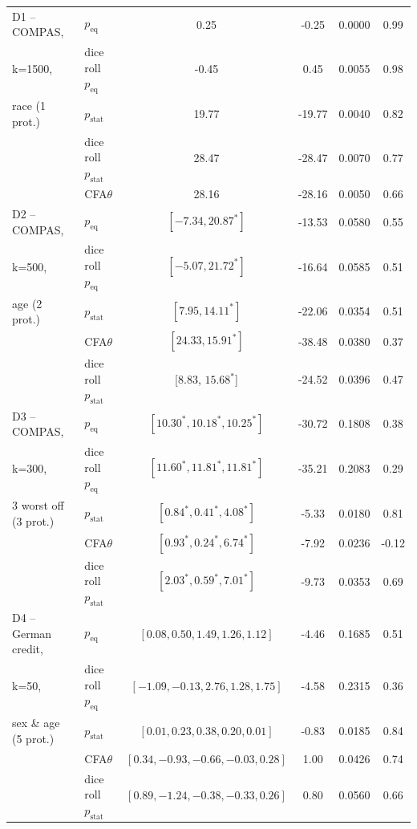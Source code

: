\begin{table}[t!]
{\begin{tabular}{llcccc}
		\midrule
		\midrule
		D1 -- COMPAS,	& \algoFAIR $p_{\text{eq}}$ 	& 0.25 	& -0.25 	& 0.0000	& 0.99\\
		k=1500,			& dice roll $p_{\text{eq}}$		& -0.45 & 0.45		& 0.0055 	& 0.98\\
						\cline{2-6}
		race (1 prot.)	& \algoFAIR $p_{\text{stat}}$	& 19.77 & -19.77 	& 0.0040 	& 0.82\\
						& dice roll $p_{\text{stat}}$	& 28.47 & -28.47	& 0.0070	& 0.77 \\
						& CFA$\theta$ 					& 28.16 & -28.16	& 0.0050	& 0.66\\
		\midrule
		\midrule
		D2 -- COMPAS, 	& \algoFAIR $p_{\text{eq}}$ 	& $[-7.34, 20.87^*]$ 	& -13.53 	& 0.0580 & 0.55 \\
		k=500,			& dice roll $p_{\text{eq}}$		& $[-5.07, 21.72^*]$ 	& -16.64	& 0.0585 & 0.51\\
						\cline{2-6}
		age (2 prot.)	& \algoFAIR $p_{\text{stat}}$ 	& $[7.95, 14.11^*]$ 	& -22.06 	& 0.0354 & 0.51 \\
						& CFA$\theta$ 					& $[24.33, 15.91^*]$ 	& -38.48	& 0.0380 & 0.37 \\ %
						& dice roll $p_{\text{stat}}$	& [8.83, $15.68^*$] 	& -24.52	& 0.0396 & 0.47 \\
		\midrule
		\midrule
		D3 -- COMPAS, 			& \algoFAIR  $p_{\text{eq}}$ 	& $[10.30^*, 10.18^*, 10.25^*]$ & -30.72	& 0.1808 & 0.38 \\
		k=300, 					& dice roll $p_{\text{eq}}$		& $[11.60^*, 11.81^*, 11.81^*]$	& -35.21	& 0.2083 & 0.29\\
								\cline{2-6}
		3 worst off (3 prot.)	& \algoFAIR  $p_{\text{stat}}$ 	& $[0.84^*, 0.41^*, 4.08^*]$ 	& -5.33		& 0.0180 & 0.81\\
							 	& CFA$\theta$ 					& $[0.93^*, 0.24^*, 6.74^*]$ 	& -7.92		& 0.0236 & -0.12 \\
								& dice roll $p_{\text{stat}}$	& $[2.03^*, 0.59^*, 7.01^*]$	& -9.73		& 0.0353 & 0.69 \\

		\midrule
		\midrule
		D4 -- German credit, 	& \algoFAIR $p_{\text{eq}}$ 	&  $[0.08, 0.50, 1.49, 1.26, 1.12]$ 	& -4.46 &	0.1685	& 0.51 \\
		k=50,					& dice roll $p_{\text{eq}}$		& $[-1.09, -0.13, 2.76, 1.28, 1.75]$	& -4.58	& 0.2315 & 0.36\\
								\cline{2-6}
		sex \& age (5 prot.)	& \algoFAIR $p_{\text{stat}}$ 	&  $[0.01, 0.23, 0.38, 0.20, 0.01]$		& -0.83 &	0.0185	& 0.84 \\
								& CFA$\theta$ 					&  $[0.34, -0.93, -0.66, -0.03, 0.28]$ 	& 1.00	& 0.0426	& 0.74 \\
								& dice roll $p_{\text{stat}}$	& $[0.89, -1.24, -0.38, -0.33, 0.26]$	& 0.80		& 0.0560 & 0.66 \\
								

\end{tabular}}
\end{table}
